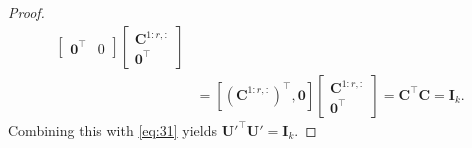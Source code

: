 \documentclass[11pt,a4paper]{article}
\theoremstyle{break}
\numberwithin{dummy}{section}
\theoremstyle{plain}
\theoremstyle{plain}
\theoremstyle{plain}
\theoremstyle{plain}
\theoremstyle{plain}
\theoremstyle{MyNonumberplain}
\newtheorem{proof}{Proof}
\newcommand{\0}{\M{0}}
\newcommand{\M}[1]{\mathbf{#1}}
\newcommand{\T}{\top}
\begin{document}
\begin{proof}
\begin{align*}
\begin{bmatrix}
                       \0^\T & 0
                     \end{bmatrix}
                              \begin{bmatrix}
                                \M{C}^{1:r,:}
                                \\
                                \0^\T
                              \end{bmatrix}
    \\ & =
                [(\M{C}^{1:r, :})^\T, \0]
                \begin{bmatrix}
                  \M{C}^{1:r,:}
                  \\
                  \0^\T
                \end{bmatrix}
    = \M{C}^\T \M{C} = \M{I}_k.
  \end{align*}
  Combining this with \eqref{eq:31} yields
    \begin{math}
      \M{U}'^\T \M{U'} = \M{I}_k.
    \end{math}


\end{proof}
\end{document}
